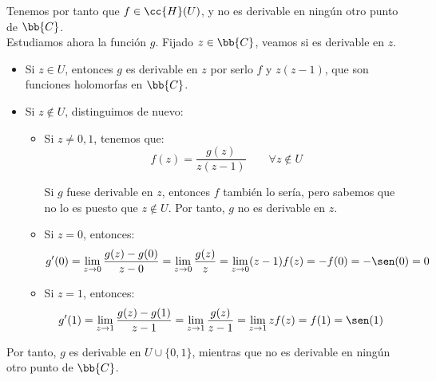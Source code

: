 \documentclass[12pt]{article}
\begin{document}
\begin{ejercicio}[3 puntos]
        Tenemos por tanto que $f\in \cc{H}(U)$, y no es derivable en ningún otro punto de $\bb{C}$.\\

        Estudiamos ahora la función $g$. Fijado $z\in \bb{C}$, veamos si es derivable en $z$.
        \begin{itemize}
            \item Si $z\in U$, entonces $g$ es derivable en $z$ por serlo $f$ y $z(z-1)$, que son funciones holomorfas en $\bb{C}$.
            \item Si $z\notin U$, distinguimos de nuevo:
            \begin{itemize}
                \item Si $z\neq 0,1$, tenemos que:
                \begin{equation*}
                    f(z) = \dfrac{g(z)}{z(z-1)}\qquad \forall z\notin U
                \end{equation*}

                Si $g$ fuese derivable en $z$, entonces $f$ también lo sería, pero sabemos que no lo es puesto que $z\notin U$. Por tanto, $g$ no es derivable en $z$.

                \item Si $z=0$, entonces:
                \begin{align*}
                    g'(0) &= \lim_{z\to 0} \frac{g(z)-g(0)}{z-0} = \lim_{z\to 0} \frac{g(z)}{z} = \lim_{z\to 0} (z-1)f(z) = -f(0) = -\sen(0) = 0
                \end{align*}

                \item Si $z=1$, entonces:
                \begin{align*}
                    g'(1) &= \lim_{z\to 1} \frac{g(z)-g(1)}{z-1} = \lim_{z\to 1} \frac{g(z)}{z-1} = \lim_{z\to 1} zf(z) = f(1) = \sen(1)
                \end{align*}
            \end{itemize}
        \end{itemize}

        Por tanto, $g$ es derivable en $U\cup \{0,1\}$, mientras que no es derivable en ningún otro punto de $\bb{C}$.
    \end{ejercicio}
\end{document}
